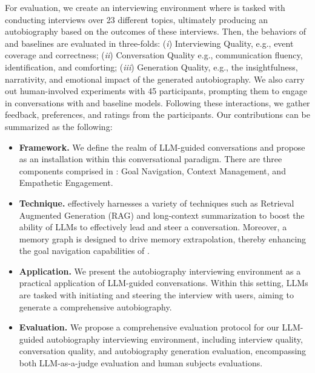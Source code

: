 For evaluation, we create an interviewing environment where \methodname is tasked with conducting interviews over 23 different topics, ultimately producing an autobiography based on the outcomes of these interviews. Then, the behaviors of \methodname and baselines are evaluated in three-folds: (\textit{i}) {Interviewing Quality}, {e.g., event coverage and correctness}; (\textit{ii}) {Conversation Quality} {e.g., communication fluency, identification, and comforting}; (\textit{iii}) {Generation Quality}, {e.g., the insightfulness, narrativity, and emotional impact of the generated autobiography}. We also carry out human-involved experiments with 45 participants, prompting them to engage in conversations with \methodname and baseline models. Following these interactions, we gather feedback, preferences, and ratings from the participants.
Our contributions can be summarized as the following:
\begin{itemize}

    \item \textbf{Framework.} We define the realm of LLM-guided conversations and propose \methodname as an installation within this conversational paradigm. There are three components comprised in \methodname: Goal Navigation, Context Management, and Empathetic Engagement.

    \item \textbf{Technique.} \methodname effectively harnesses a variety of techniques such as Retrieval Augmented Generation (RAG) and long-context summarization to boost the ability of LLMs to effectively lead and steer a conversation. Moreover, a memory graph is designed to drive memory extrapolation, thereby enhancing the goal navigation capabilities of \methodname.

    \item \textbf{Application.} We present the autobiography interviewing environment as a practical application of LLM-guided conversations. Within this setting, LLMs are tasked with initiating and steering the interview with users, aiming to generate a comprehensive autobiography.

    \item \textbf{Evaluation.} We propose a comprehensive evaluation protocol for our LLM-guided autobiography interviewing environment, including interview quality, conversation quality, and autobiography generation evaluation, encompassing both LLM-as-a-judge evaluation and human subjects evaluations.
\end{itemize}